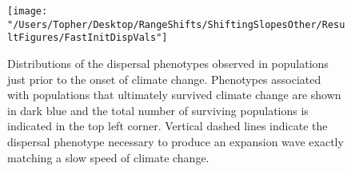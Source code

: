 \documentclass[12pt, oneside]{article}
\begin{document}
\begin{figure}
\centering
\texttt{[image: "/Users/Topher/Desktop/RangeShifts/ShiftingSlopesOther/ResultFigures/FastInitDispVals"]}
\vspace{-5mm}
\caption[LoF entry]{Distributions of the dispersal phenotypes observed in populations just prior to the onset of climate change. Phenotypes associated with populations that ultimately survived climate change are shown in dark blue and the total number of surviving populations is indicated in the top left corner. Vertical dashed lines indicate the dispersal phenotype necessary to produce an expansion wave exactly matching a slow speed of climate change.}
\label{fig:InitDispFast}
\end{figure}
\end{document}
